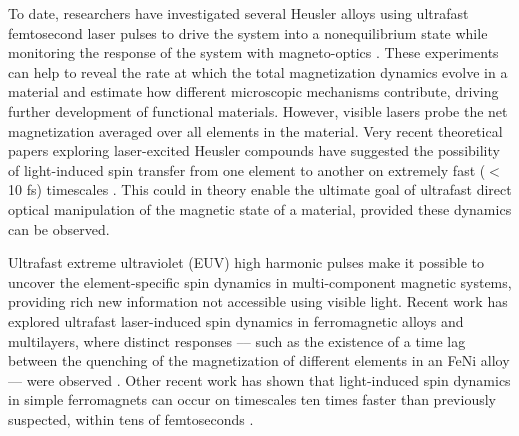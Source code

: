 To date, researchers have investigated several Heusler alloys using ultrafast femtosecond laser pulses to drive the system into a nonequilibrium state while monitoring the response of the system with magneto-optics \cite{Muller2009, Mann2012,Steil2010,Wustenberg2011}. These experiments can help to reveal the rate at which the total magnetization dynamics evolve in a material and estimate how different microscopic mechanisms contribute, driving further development of functional materials. However, visible lasers probe the net magnetization averaged over all elements in the material. Very recent theoretical papers exploring laser-excited Heusler compounds have suggested the possibility of light-induced spin transfer from one element to another on extremely fast ($<$10 fs) timescales \cite{Dewhurst2018,Elliott2016}. This could in theory enable the ultimate goal of ultrafast direct optical manipulation of the magnetic state of a material, provided these dynamics can be observed.

Ultrafast extreme ultraviolet (EUV) high harmonic pulses make it possible to uncover the element-specific spin dynamics in multi-component magnetic systems, providing rich new information not accessible using visible light. Recent work has explored ultrafast laser-induced spin dynamics in ferromagnetic alloys and multilayers, where distinct responses –– such as the existence of a time lag between the quenching of the magnetization of different elements in an FeNi alloy –– were observed \cite{Mathias2012}. Other recent work has shown that light-induced spin dynamics in simple ferromagnets can occur on timescales ten times faster than previously suspected, within tens of femtoseconds \cite{Gort2018,Tengdin2018}. 

